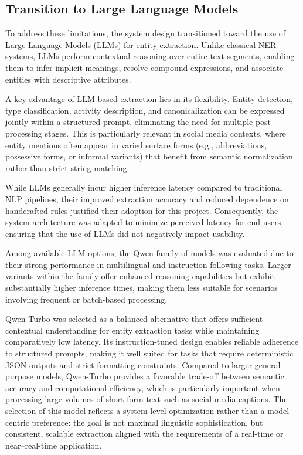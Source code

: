 \documentclass[a4paper,12pt]{report}
\begin{document}
\subsection{Transition to Large Language Models}

To address these limitations, the system design transitioned toward the use of Large Language Models (LLMs) for entity extraction. Unlike classical NER systems, LLMs perform contextual reasoning over entire text segments, enabling them to infer implicit meanings, resolve compound expressions, and associate entities with descriptive attributes.

A key advantage of LLM-based extraction lies in its flexibility. Entity detection, type classification, activity description, and canonicalization can be expressed jointly within a structured prompt, eliminating the need for multiple post-processing stages. This is particularly relevant in social media contexts, where entity mentions often appear in varied surface forms (e.g., abbreviations, possessive forms, or informal variants) that benefit from semantic normalization rather than strict string matching.

While LLMs generally incur higher inference latency compared to traditional NLP pipelines, their improved extraction accuracy and reduced dependence on handcrafted rules justified their adoption for this project. Consequently, the system architecture was adapted to minimize perceived latency for end users, ensuring that the use of LLMs did not negatively impact usability.

Among available LLM options, the Qwen family of models was evaluated due to their strong performance in multilingual and instruction-following tasks. Larger variants within the family offer enhanced reasoning capabilities but exhibit substantially higher inference times, making them less suitable for scenarios involving frequent or batch-based processing.

Qwen-Turbo \cite{qwen} was selected as a balanced alternative that offers sufficient contextual understanding for entity extraction tasks while maintaining comparatively low latency. Its instruction-tuned design enables reliable adherence to structured prompts, making it well suited for tasks that require deterministic JSON outputs and strict formatting constraints. Compared to larger general-purpose models, Qwen-Turbo provides a favorable trade-off between semantic accuracy and computational efficiency, which is particularly important when processing large volumes of short-form text such as social media captions.
The selection of this model reflects a system-level optimization rather than a model-centric preference: the goal is not maximal linguistic sophistication, but consistent, scalable extraction aligned with the requirements of a real-time or near–real-time application.
\end{document}
